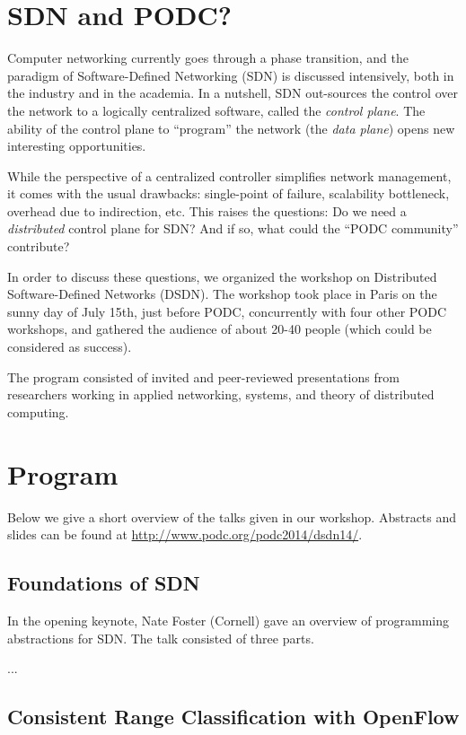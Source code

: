 \documentclass[11pt,pdftex,letter]{article}
\begin{document}
\section{SDN and PODC?}

Computer networking currently goes through a phase transition, and the paradigm of Software-Defined Networking (SDN)
is discussed intensively, both in the industry and in the academia. In
a nutshell, SDN out-sources the control over the network 
to a logically centralized software, called the \emph{control plane}. 
The ability of the control plane to ``program'' the network (the
\emph{data plane}) opens new interesting opportunities.

 While the perspective of a centralized controller simplifies network management,
it comes with the usual drawbacks: single-point of failure,
scalability bottleneck, overhead due to indirection, etc. 
This raises the questions: Do we need a \emph{distributed} control plane for SDN? And if so,
what could the ``PODC community'' contribute?

In order to discuss these questions, we organized the workshop on Distributed
Software-Defined Networks (DSDN). The workshop took
place in Paris on the sunny day of July 15th, just before
PODC, concurrently with four other PODC workshops, and gathered the
audience of about 20-40 people (which could be considered as success). 

The program consisted of invited and peer-reviewed presentations from researchers working in applied networking,
systems, and theory of distributed computing.


\section{Program}

Below we give a short overview of the talks given in our
workshop. Abstracts and slides can be found at \url{http://www.podc.org/podc2014/dsdn14/}. 

\subsection{Foundations of SDN}

In the opening keynote, Nate Foster (Cornell) gave an overview of
programming abstractions for SDN. The talk consisted of three parts. 

... 


\subsection{Consistent Range Classification with OpenFlow} 
\end{document}
